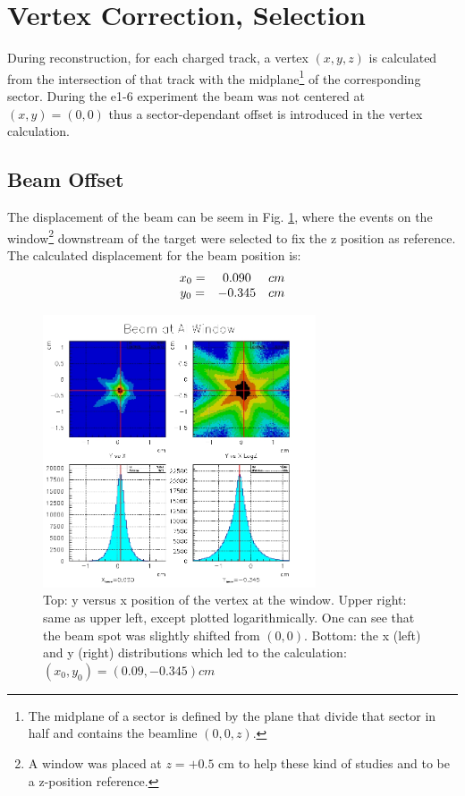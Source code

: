 \section{Vertex Correction, Selection}

During reconstruction, for each charged track, a vertex $(x,y,z)$ is calculated
from the intersection of that track with the midplane\footnote{The midplane of
a sector is defined by the plane that divide that sector in half and contains
the beamline $(0,0,z)$.} of the corresponding sector. During the e1-6 experiment
the beam was not centered at $(x,y) = (0,0)$ thus a sector-dependant offset 
is introduced in the vertex calculation. 



\subsection{Beam Offset}
The displacement of the beam can be seem in Fig. \ref{fig:vertex_id}, where the events
on the window\footnote{A window was placed at $z=+0.5$ cm to help these kind of 
studies and to be a z-position reference.} downstream of the target were 
selected to fix the z position as reference. The calculated displacement
\cite{bib:valeri_vertex} for the beam position is:
$$
\begin{array}{c c c}
 x_0 = & 0.090   & cm \\
 y_0 = & -0.345 & cm
\end{array}
$$

\begin{figure}[ht]
	\centering
		\includegraphics[width=0.72\textwidth ]{img/beam_displacement.jpg}
			\caption{Top: y versus x position of the vertex at the window.
						Upper right: same as upper left, except plotted logarithmically.
	               One can see that the beam spot was slightly shifted from $(0,0)$.
						Bottom: the x (left) and y (right) distributions which led to
						the calculation: $(x_0, y_0) = (0.09, -0.345)cm$ }
			\label{fig:vertex_id}
\end{figure}

